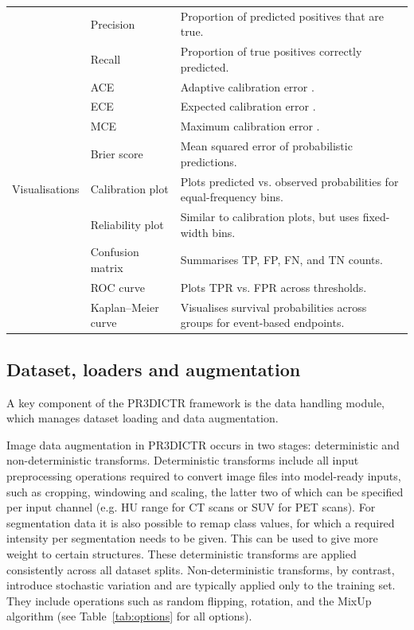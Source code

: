 \documentclass[11pt]{article}
\begin{document}
\begin{longtable}{P{0.16\textwidth}P{0.18\textwidth}P{0.58\textwidth}}
 & Precision & Proportion of predicted positives that are true. \\
 & Recall & Proportion of true positives correctly predicted. \\
 & ACE & Adaptive calibration error \cite{Nixon2020}. \\
 & ECE & Expected calibration error \cite{Nixon2020}. \\
 & MCE & Maximum calibration error \cite{Nixon2020}. \\
 & Brier score & Mean squared error of probabilistic predictions. \\
\hline
Visualisations & Calibration plot & Plots predicted vs. observed probabilities for equal-frequency bins. \\
 & Reliability plot & Similar to calibration plots, but uses fixed-width bins. \\
 & Confusion matrix & Summarises TP, FP, FN, and TN counts. \\
 & ROC curve & Plots TPR vs. FPR across thresholds. \\
 & Kaplan--Meier curve & Visualises survival probabilities across groups for event-based endpoints. \\

\end{longtable}

\normalsize

\subsection{Dataset, loaders and augmentation}

A key component of the PR3DICTR framework is the data handling module, which manages dataset loading and data augmentation.

Image data augmentation in PR3DICTR occurs in two stages: deterministic and non-deterministic transforms. Deterministic transforms include all input preprocessing operations required to convert image files into model-ready inputs, such as cropping, windowing and scaling, the latter two of which can be specified per input channel (e.g. HU range for CT scans or SUV for PET scans). For segmentation data it is also possible to remap class values, for which a required intensity per segmentation needs to be given. This can be used to give more weight to certain structures. These deterministic transforms are applied consistently across all dataset splits. Non-deterministic transforms, by contrast, introduce stochastic variation and are typically applied only to the training set. They include operations such as random flipping, rotation, and the MixUp algorithm (see Table~\ref{tab:options} for all options).
\end{document}
